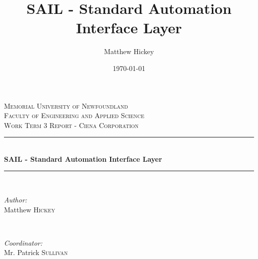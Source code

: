 \documentclass[10pt, titlepage, onecolumn, openany]{article}
\title{SAIL - Standard Automation Interface Layer}
\author{Matthew Hickey}
\date{\today}
\begin{document}
\begin{titlepage}

\newcommand{\HRule}{\rule{\linewidth}{0.5mm}} %

\center %


\textsc{\LARGE Memorial University of Newfoundland}\\[1.5cm]
\textsc{\Large Faculty of Engineering and Applied Science}\\[0.5cm] %
\textsc{\large Work Term 3 Report - Ciena Corporation}\\[0.5cm] %


\HRule \\[0.4cm]
{ \huge \bfseries SAIL - Standard Automation Interface Layer}\\[0.4cm] %
\HRule \\[1.5cm]


\begin{minipage}{0.4\textwidth}
\begin{flushleft} \large
\emph{Author:}\\
Matthew \textsc{Hickey}
\end{flushleft}
\end{minipage}
~
\begin{minipage}{0.4\textwidth}
\begin{flushright} \large
\emph{Coordinator:} \\
Mr. Patrick \textsc{Sullivan} %
\end{flushright}
\end{minipage}\\[2cm]



\end{titlepage}
\end{document}
